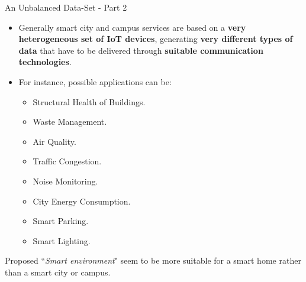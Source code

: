 \documentclass[10pt]{beamer}
\begin{document}
\begin{frame}{An Unbalanced Data-Set - Part 2}

\begin{itemize}
\justifying
\item Generally smart city and campus services are based on a \textbf{very heterogeneous set of IoT devices}, generating \textbf{very different types of data} that have to be delivered through \textbf{suitable communication technologies}.

\item For instance, possible applications can be:

\begin{itemize}
\item Structural Health of Buildings.
\item Waste Management.
\item Air Quality.
\item Traffic Congestion.
\item Noise Monitoring.
\item City Energy Consumption.
\item Smart Parking.
\item Smart Lighting.
\end{itemize}

\end{itemize}

\begin{block}{}
Proposed ``\textit{Smart environment}" seem to be more suitable for a smart home rather than a smart city or campus.
\end{block}

\end{frame} 
\end{document}
